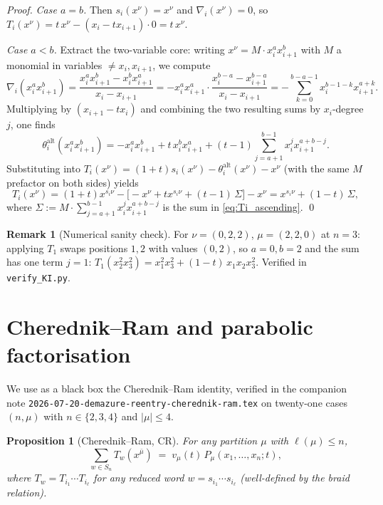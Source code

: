 \documentclass[11pt]{article}
\newtheorem{proposition}[theorem]{Proposition}
\theoremstyle{definition}
\newtheorem{remark}[theorem]{Remark}
\begin{document}
\begin{proof}
\emph{Case $a = b$.} Then $s_i(x^\nu) = x^\nu$ and $\nabla_i(x^\nu) = 0$,
so $T_i(x^\nu) = t\,x^\nu - (x_i - t x_{i+1})\cdot 0 = t\,x^\nu$.

\emph{Case $a < b$.} Extract the two-variable core: writing
$x^\nu = M \cdot x_i^{a} x_{i+1}^{b}$ with $M$ a monomial in variables
$\ne x_i, x_{i+1}$, we compute
\[
\nabla_i(x_i^a x_{i+1}^b)
  = \frac{x_i^a x_{i+1}^b - x_i^b x_{i+1}^a}{x_i - x_{i+1}}
  = -x_i^a x_{i+1}^a \cdot \frac{x_i^{b-a} - x_{i+1}^{b-a}}{x_i - x_{i+1}}
  = -\sum_{k=0}^{b-a-1} x_i^{b-1-k} x_{i+1}^{a+k}.
\]
Multiplying by $(x_{i+1} - t x_i)$ and combining the two resulting sums
by $x_i$-degree $j$, one finds
\[
\theta_i^{\mathrm{alt}}(x_i^a x_{i+1}^b)
  = -x_i^a x_{i+1}^b + t\,x_i^b x_{i+1}^a + (t-1)\!\!\!\sum_{j=a+1}^{b-1}\!\! x_i^j x_{i+1}^{a+b-j}.
\]
Substituting into $T_i(x^\nu) = (1+t) s_i(x^\nu) - \theta_i^{\mathrm{alt}}(x^\nu) - x^\nu$
(with the same $M$ prefactor on both sides) yields
\[
T_i(x^\nu) = (1+t) x^{s_i\nu} - \bigl[-x^\nu + t x^{s_i\nu} + (t-1)\, \Sigma\bigr] - x^\nu
= x^{s_i\nu} + (1-t)\,\Sigma,
\]
where $\Sigma := M \cdot \sum_{j=a+1}^{b-1} x_i^j x_{i+1}^{a+b-j}$ is the
sum in \eqref{eq:Ti_ascending}. \qed
\end{proof}

\begin{remark}[Numerical sanity check]
For $\nu = (0, 2, 2)$, $\mu = (2,2,0)$ at $n = 3$: applying $T_1$ swaps
positions $1,2$ with values $(0, 2)$, so $a=0, b=2$ and the sum has one
term $j=1$: $T_1(x_2^2 x_3^2) = x_1^2 x_3^2 + (1-t)\, x_1 x_2 x_3^2$.
Verified in \texttt{verify\_KI.py}.
\end{remark}

\section{Cherednik--Ram and parabolic factorisation}

We use as a black box the Cherednik--Ram identity, verified in the
companion note \texttt{2026-07-20-demazure-reentry-cherednik-ram.tex}
on twenty-one cases $(n, \mu)$ with $n \in \{2,3,4\}$ and $|\mu| \le 4$.

\begin{proposition}[Cherednik--Ram, CR]\label{prop:CR}
For any partition $\mu$ with $\ell(\mu) \le n$,
\[
\sum_{w \in S_n} T_w(x^{\bar\mu}) \;=\; v_\mu(t)\,P_\mu(x_1, \ldots, x_n; t),
\]
where $T_w = T_{i_1}\cdots T_{i_\ell}$ for any reduced word
$w = s_{i_1}\cdots s_{i_\ell}$ (well-defined by the braid relation).
\end{proposition}
\end{document}
